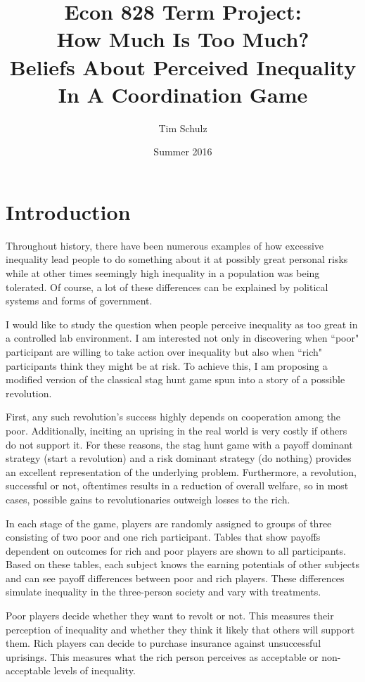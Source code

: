\documentclass[12pt]{article}
\title{Econ 828 Term Project:\\ How Much Is Too Much?\\
		Beliefs About Perceived Inequality In A Coordination Game}
\author{Tim Schulz}
\date{Summer 2016}
\begin{document}
	\maketitle
	\doublespacing
	\section{Introduction}
	Throughout history, there have been numerous examples of how excessive 
	inequality lead people to do something about it at possibly great personal 
	risks while at other times seemingly high inequality in a population was 
	being tolerated. Of course, a lot of these differences can be explained by 
	political systems and forms of government.
	
	I would like to study the question when people perceive inequality as too 
	great in a controlled lab environment. I am interested not only in 
	discovering when ``poor" participant are willing to take action over 
	inequality but also when ``rich" participants think they might be at risk. 
	To achieve this, I am proposing a modified version of the classical stag 
	hunt game spun into a story of a possible revolution.
	
	First, any such revolution's success highly depends on cooperation among 
	the poor. Additionally, inciting an uprising in the real world is very 
	costly if others do not support it. For these reasons, the stag hunt game 
	with a payoff dominant strategy (start a revolution) and a risk dominant 
	strategy (do nothing) provides an excellent representation of the 
	underlying problem. Furthermore, a revolution, successful or not, 
	oftentimes results in a reduction of overall welfare, so in most cases, 
	possible gains to revolutionaries outweigh losses to the rich.
	
	In each stage of the game, players are randomly assigned to groups of three 
	consisting of two poor and one rich participant. Tables that show payoffs 
	dependent on outcomes for rich and poor players are shown to all 
	participants. Based on these tables, each subject knows the earning 
	potentials of other subjects and can see payoff differences between poor 
	and rich players. These differences simulate inequality in the three-person 
	society and vary with treatments.
	
	Poor players decide whether they want to revolt or not. This measures their 
	perception of inequality and whether they think it likely that others will 
	support them. Rich players can decide to purchase insurance against 
	unsuccessful uprisings. This measures what the rich person perceives as 
	acceptable or non-acceptable levels of inequality.
	
\end{document}
